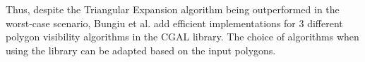 Thus, despite the Triangular Expansion algorithm being outperformed in the worst-case scenario, Bungiu et al. add efficient implementations for  3 different  polygon visibility algorithms in the CGAL library. The choice of algorithms when using the library can be adapted based on the input polygons. 

